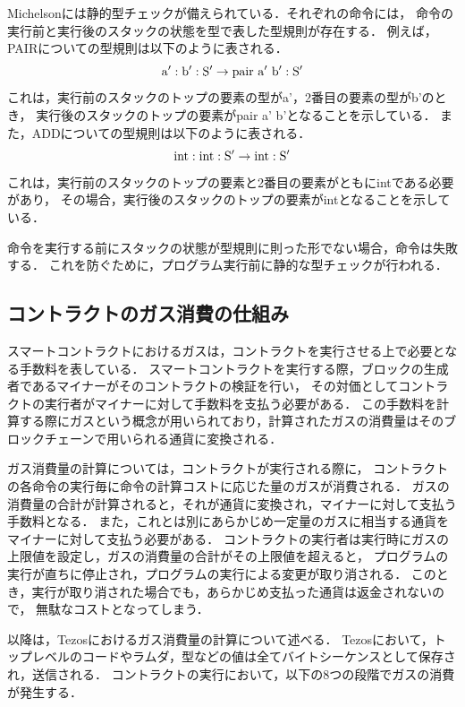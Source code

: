 \documentclass{kuisthesis}
\begin{document}
Michelsonには静的型チェックが備えられている．それぞれの命令には，
命令の実行前と実行後のスタックの状態を型で表した型規則が存在する．
例えば，PAIRについての型規則は以下のように表される．
\begin{displaymath}
  {\rm a' : b' : S'} \rightarrow {\rm pair\ a'\ b' : S'}
\end{displaymath}
これは，実行前のスタックのトップの要素の型がa'，2番目の要素の型がb'のとき，
実行後のスタックのトップの要素がpair a' b'となることを示している．
また，ADDについての型規則は以下のように表される．
\begin{displaymath}
  {\rm int : int : S'} \rightarrow {\rm int : S'}
\end{displaymath}
これは，実行前のスタックのトップの要素と2番目の要素がともにintである必要があり，
その場合，実行後のスタックのトップの要素がintとなることを示している．

命令を実行する前にスタックの状態が型規則に則った形でない場合，命令は失敗する．
これを防ぐために，プログラム実行前に静的な型チェックが行われる．

\subsection{コントラクトのガス消費の仕組み}\label{subsec-pre-gas}
スマートコントラクトにおけるガスは，コントラクトを実行させる上で必要となる手数料を表している．
スマートコントラクトを実行する際，ブロックの生成者であるマイナーがそのコントラクトの検証を行い，
その対価としてコントラクトの実行者がマイナーに対して手数料を支払う必要がある．
この手数料を計算する際にガスという概念が用いられており，計算されたガスの消費量はそのブロックチェーンで用いられる通貨に変換される．


ガス消費量の計算については，コントラクトが実行される際に，
コントラクトの各命令の実行毎に命令の計算コストに応じた量のガスが消費される．
ガスの消費量の合計が計算されると，それが通貨に変換され，マイナーに対して支払う手数料となる．
また，これとは別にあらかじめ一定量のガスに相当する通貨をマイナーに対して支払う必要がある．
コントラクトの実行者は実行時にガスの上限値を設定し，ガスの消費量の合計がその上限値を超えると，
プログラムの実行が直ちに停止され，プログラムの実行による変更が取り消される．
このとき，実行が取り消された場合でも，あらかじめ支払った通貨は返金されないので，
無駄なコストとなってしまう．

以降は，Tezosにおけるガス消費量の計算について述べる．
Tezosにおいて，トップレベルのコードやラムダ，型などの値は全てバイトシーケンスとして保存され，送信される．
コントラクトの実行において，以下の8つの段階でガスの消費が発生する．
\end{document}
